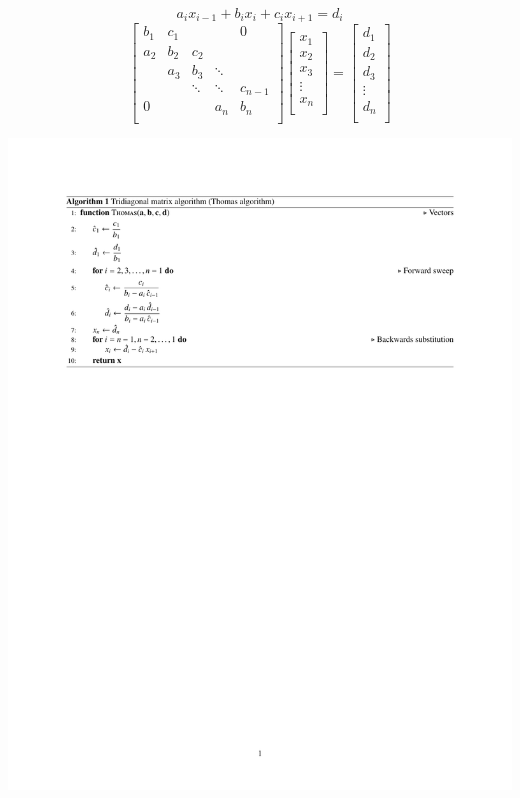 \begin{frame}
  $$a_{i}x_{{i-1}}+b_{i}x_{i}+c_{i}x_{{i+1}}=d_{i}$$
  $$\begin{bmatrix}{b_{1}}&{c_{1}}&{}&{}&{0}\\
      {a_{2}}&{b_{2}}&{c_{2}}&{}&{}\\
      {}&{a_{3}}&{b_{3}}&\ddots &{}\\
      {}&{}&\ddots &\ddots &{c_{n-1}}\\
      {0}&{}&{}&{a_{n}}&{b_{n}}\\
      \end{bmatrix}
      \begin{bmatrix}{x_{1}}\\
      {x_{2}}\\{x_{3}}\\\vdots \\
      {x_{n}}\\
      \end{bmatrix}
      =
      \begin{bmatrix}{d_{1}}\\
      {d_{2}}\\{d_{3}}\\
      \vdots \\{d_{n}}\\
    \end{bmatrix} $$
\end{frame}

\begin{frame}
\begin{center}
  \includegraphics[width=.9\linewidth]{../BurgersEquation/tex/implicit/algo_cropped.pdf}\\
\end{center}
\end{frame}

